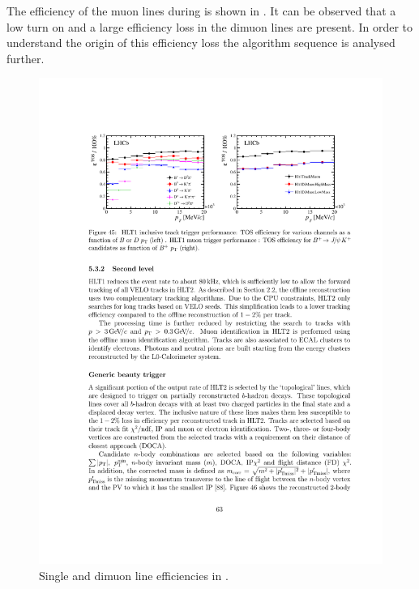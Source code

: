 The efficiency of the muon lines during \runone is shown in .
It can be observed that a low \pt turn on and a large efficiency loss in the dimuon lines are present.
In order to understand the origin of this efficiency loss the \hltone algorithm sequence is analysed further.


\begin{figure}[h!]
  \centering
  \includegraphics[trim=11cm 20.5cm 2cm 3cm, clip=true,scale=1.]{Figures/Chapter3/hlt1_muon_eff_run1.pdf}
  \caption{ Single and dimuon \hltone line efficiencies in \runone \cite{LHCb-PROC-2014-005}. }
  \label{fig:hlt1_eff_run1}
\end{figure}


